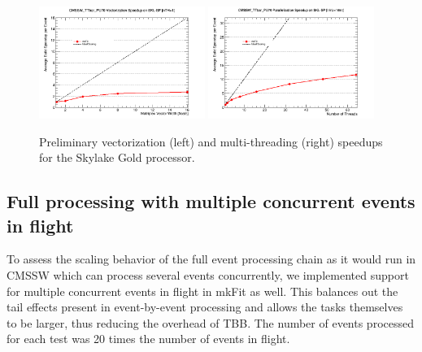 \documentclass{webofc}
\def\mkfit{mkFit\xspace}
\def\twop{0.48\textwidth}
\def\postfigskip{\vskip-4mm}
\begin{document}
\begin{figure}[htb]
  \centering
  \includegraphics[width=\twop]{figs/comp/SKL-SP_CMSSW_TTbar_PU70_VU_speedup.png}
  \hfill
  \includegraphics[width=\twop]{figs/comp/SKL-SP_CMSSW_TTbar_PU70_TH_speedup.png}
  \postfigskip

  \caption{Preliminary vectorization (left) and multi-threading (right) speedups 
    for the Skylake Gold processor.}
  \label{fig:vec-th-speedup-skl}
\end{figure}

\subsection{Full processing with multiple concurrent events in flight}

To assess the scaling behavior of the full event processing chain as it would
run in CMSSW which can process several events concurrently, we implemented
support for multiple concurrent events in flight in \mkfit as well. This
balances out the tail effects present in event-by-event processing and allows
the tasks themselves to be larger, thus reducing the overhead of TBB. The 
number of events processed for each test was 20 times the number of events in 
flight. 
\end{document}
